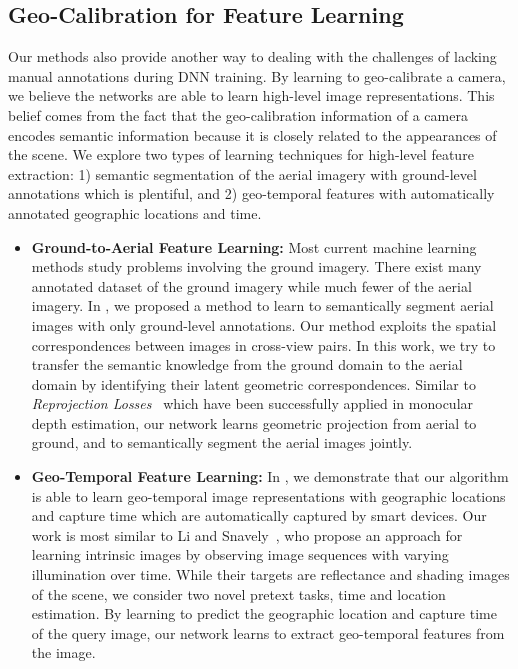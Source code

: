 \subsection{Geo-Calibration for Feature Learning}
Our methods also provide another way to dealing with the challenges of
lacking manual annotations during DNN training. By learning to
geo-calibrate a camera, we believe the networks are able to learn
high-level image representations. This belief comes from the fact that
the geo-calibration information of a camera encodes semantic
information because it is closely related to the appearances of the
scene.
We explore two types of learning techniques for high-level feature
extraction: 1) semantic segmentation of the aerial imagery with
ground-level annotations which is plentiful, and 2) geo-temporal
features with automatically annotated geographic locations and time.

\begin{itemize}[noitemsep]
  \item \textbf{Ground-to-Aerial Feature Learning:}
  Most current machine learning methods study problems involving the
  ground imagery. There exist many annotated dataset of the ground
  imagery while much fewer of the aerial imagery. 
  In , we proposed a
  method to learn to semantically segment aerial images with only
  ground-level annotations. Our method exploits the spatial
  correspondences between images in cross-view pairs. 
  In this work, we try to transfer the semantic knowledge from the
  ground domain to the aerial domain by identifying their latent
  geometric correspondences. Similar to {\em
  Reprojection Losses}~\cite{garg2016unsupervised,
  godard2017unsupervised,zhou2017unsupervised, yan2016perspective}
  which have been successfully applied in monocular depth estimation,
  our network learns geometric projection from aerial to ground, and
  to semantically segment the aerial images jointly.
  \newline

  \item \textbf{Geo-Temporal Feature Learning:}
  In , we demonstrate that our algorithm is able to
  learn geo-temporal image representations with geographic locations and
  capture time which are automatically captured by smart devices.
  Our work is most similar to Li and Snavely~\cite{li2018learning},
  who propose an approach for learning intrinsic images by observing
  image sequences with varying illumination over time. While their
  targets are reflectance and shading images of the scene, we consider
  two novel pretext tasks, time and location estimation.
  By learning to predict the geographic location and capture time of
  the query image, our network learns to extract geo-temporal features
  from the image.

\end{itemize}
